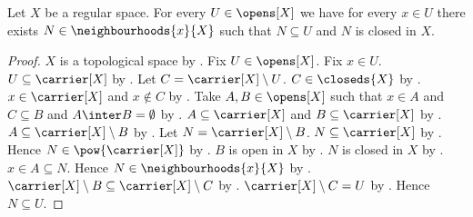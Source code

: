 \begin{proposition}\label{regular_implies_closed_neighbourhood_in_open}
    Let $X$ be a regular space.
    For every $U\in\opens[X]$ we have for every $x\in U$ there exists
        $N\in\neighbourhoods{x}{X}$ such that
        $N\subseteq U$ and $N$ is closed in $X$.
\end{proposition}
\begin{proof}
    $X$ is a topological space by .
    Fix $U\in\opens[X]$.
    Fix $x\in U$.
    $U\subseteq\carrier[X]$ by .
    Let $C=\carrier[X]\setminus U$.
    $C\in\closeds{X}$ by .
    $x\in\carrier[X]$ and $x\notin C$ by .
    Take $A,B\in\opens[X]$ such that $x\in A$ and $C\subseteq B$ and
        $A\inter B=\emptyset$ by .
    $A\subseteq\carrier[X]$ and $B\subseteq\carrier[X]$
        by .
    $A\subseteq\carrier[X]\setminus B$
        by .
    Let $N=\carrier[X]\setminus B$.
    $N\subseteq\carrier[X]$ by .
    Hence $N\in\pow{\carrier[X]}$ by .
    $B$ is open in $X$ by .
    $N$ is closed in $X$ by .
    $x\in A\subseteq N$.
    Hence $N\in\neighbourhoods{x}{X}$ by .
    $\carrier[X]\setminus B\subseteq\carrier[X]\setminus C$
        by .
    $\carrier[X]\setminus C=U$ by .
    Hence $N\subseteq U$.
\end{proof}

